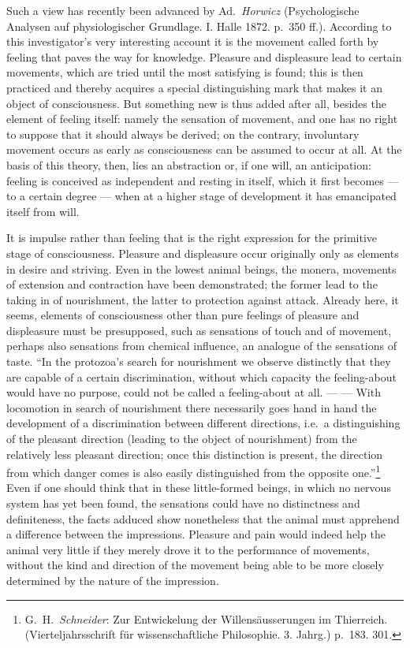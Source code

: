 \documentclass[12pt,a4paper]{book}
\newcommand{\opage}[1]{\marginnote{\footnotesize\textit{[#1]}}}
\begin{document}
Such a view has recently been advanced by Ad.~\emph{Horwicz}
(Psychologische Analysen auf physiologischer Grundlage. I. Halle 1872.
p.~350 ff.). According to this investigator's very interesting account it
is the movement called forth by feeling that paves the way for knowledge.
Pleasure and displeasure lead to certain movements, which are tried until
the most satisfying is found; this is then practiced and thereby acquires
a special distinguishing mark that makes it an object of consciousness.
But something new is thus added after all, besides the element of feeling
itself: namely the sensation of movement, and one has no right to suppose
that it should always be derived; on the contrary, involuntary movement
occurs as early as consciousness can be assumed to occur at all. At the
basis of this theory, then, lies an abstraction or, if one will, an
anticipation: feeling is conceived as independent and resting in itself,
which it first becomes --- to a certain degree --- when at a higher stage
of development it has emancipated itself from will.


\opage{115}It is impulse rather than feeling that is the right expression
for the primitive stage of consciousness. Pleasure and displeasure occur
originally only as elements in desire and striving. Even in the lowest
animal beings, the monera, movements of extension and contraction have
been demonstrated; the former lead to the taking in of nourishment, the
latter to protection against attack. Already here, it seems, elements
of consciousness other than pure feelings of pleasure and displeasure
must be presupposed, such as sensations of touch and of movement, perhaps
also sensations from chemical influence, an analogue of the sensations of
taste. ``In the protozoa's search for nourishment we observe distinctly
that they are capable of a certain discrimination, without which
capacity the feeling-about would have no purpose, could not be called a
feeling-about at all. --- --- With locomotion in search of nourishment
there necessarily goes hand in hand the development of a discrimination
between different directions, i.e.\ a distinguishing of the pleasant
direction (leading to the object of nourishment) from the relatively less
pleasant direction; once this distinction is present, the direction from
which danger comes is also easily distinguished from the
opposite one.''\footnote{G.~H.~\emph{Schneider}: Zur Entwickelung der
Willensäusserungen im Thierreich. (Vierteljahrsschrift für
wissenschaftliche Philosophie. 3. Jahrg.) p.~183. 301.} Even if one
should think that in these little-formed beings, in which no nervous
system has yet been found, the sensations could have no distinctness and
definiteness, the facts adduced show nonetheless that the animal must
apprehend a difference between the impressions. Pleasure and pain would
indeed help the animal very little if they merely drove it to the
performance of movements, without the kind and direction of the movement
being able to be more closely determined by the nature of the impression.
\end{document}

